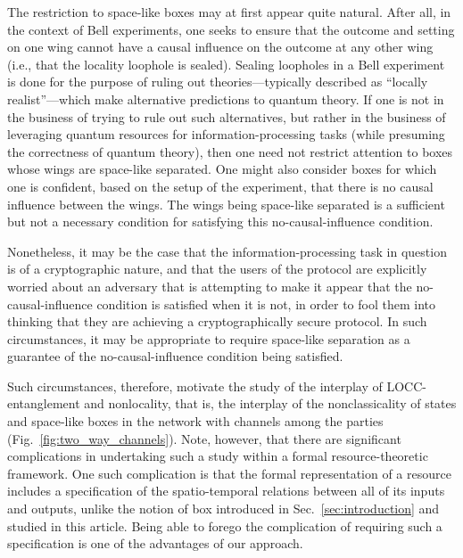 \documentclass[prx,11pt,letterpaper,twocolumn,accepted=2023-11-27]{quantumarticle}
\newcommand{\rob}{\color{black}}
\newcommand{\blk}{\color{black}}
\theoremstyle{plain}
\theoremstyle{definition}
\begin{document}
The restriction to space-like boxes
may at first appear quite natural.  After all, in the context of Bell experiments, one seeks to ensure that the outcome and setting on one wing cannot have a causal influence on the outcome at any other wing 
  (i.e., that the locality loophole is sealed).  
Sealing loopholes in a Bell experiment is done for the purpose of ruling out theories---typically described as ``locally realist''---which make alternative predictions to quantum theory.
  If one is not in the business of trying to rule out such alternatives, 
 but rather in the business of leveraging
  quantum resources for information-processing tasks (while presuming
   the correctness of quantum theory), then one need not
     restrict attention to boxes whose wings are space-like separated.  One might also consider
      boxes for which one is confident, based on the setup of the experiment, that there is no causal influence between the wings.   The wings being space-like separated is a sufficient but not a necessary condition for satisfying this no-causal-influence condition.
 
Nonetheless, 
 it may be the case that the information-processing task in question is of a cryptographic nature, and that the users of the protocol are explicitly worried about an adversary that is attempting to make it appear  that the no-causal-influence condition is satisfied when it is not, in order to fool them into thinking that they are achieving a cryptographically secure protocol.  In such circumstances, it may be appropriate to require space-like separation as a guarantee of the no-causal-influence condition being satisfied. 
  

  \sloppy Such circumstances, therefore, motivate the study of the interplay of LOCC-entanglement and nonlocality, that is, the interplay of the nonclassicality of states and \rob space-like \blk boxes in the network with channels among the parties (Fig.~\ref{fig:two_way_channels}).
Note, however, that there are significant complications in undertaking
 such a study within a formal resource-theoretic framework.
\rob
 One such complication is that 
 the formal representation of a resource 
  includes
 a specification of the spatio-temporal relations between all of its inputs and outputs, unlike the notion of box introduced in Sec.~\ref{sec:introduction} and studied in this article.
Being able to forego the complication of requiring such a specification is one of the advantages of our approach.
\blk
\end{document}
